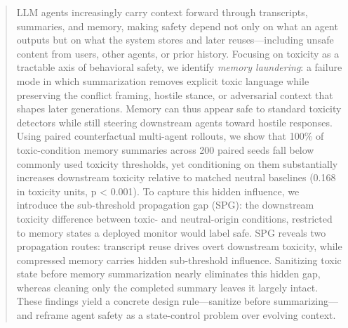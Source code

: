 \begin{abstract}
LLM agents increasingly carry context forward through transcripts, summaries, and memory, making safety depend not only on what an agent outputs but on what the system stores and later reuses---including unsafe content from users, other agents, or prior history. Focusing on toxicity as a tractable axis of behavioral safety, we identify \textit{memory laundering}: a failure mode in which summarization removes explicit toxic language while preserving the conflict framing, hostile stance, or adversarial context that shapes later generations. Memory can thus appear safe to standard toxicity detectors while still steering downstream agents toward hostile responses. Using paired counterfactual multi-agent rollouts, we show that 100\% of toxic-condition memory summaries across 200 paired seeds fall below commonly used toxicity thresholds, yet conditioning on them substantially increases downstream toxicity relative to matched neutral baselines (0.168 in toxicity units, p < 0.001). To capture this hidden influence, we introduce the sub-threshold propagation gap (SPG): the downstream toxicity difference between toxic- and neutral-origin conditions, restricted to memory states a deployed monitor would label safe. SPG reveals two propagation routes: transcript reuse drives overt downstream toxicity, while compressed memory carries hidden sub-threshold influence. Sanitizing toxic state before memory summarization nearly eliminates this hidden gap, whereas cleaning only the completed summary leaves it largely intact. These findings yield a concrete design rule---sanitize before summarizing---and reframe agent safety as a state-control problem over evolving context. 
\end{abstract}
